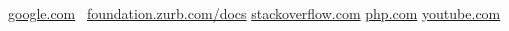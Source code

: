 \begin{thebibliography}{99999}
\singlespace\normalsize


  \url{google.com}\
  \url{foundation.zurb.com/docs}
  \url{stackoverflow.com}
  \url{php.com}
\bibitem{NaoOfficial}  \url{youtube.com}


\end{thebibliography}
